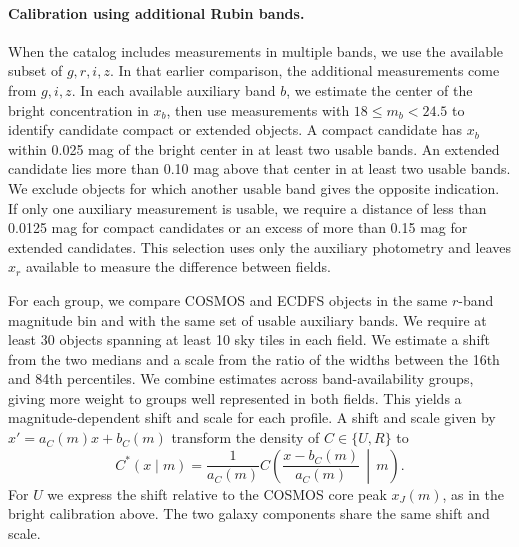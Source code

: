 \paragraph{Calibration using additional Rubin bands.}
When the catalog includes measurements in multiple bands, we use the
available subset of \(g,r,i,z\). In that earlier comparison, the additional measurements come from
\(g,i,z\). In each available auxiliary band \(b\), we estimate the
center of the bright concentration in \(x_b\), then use measurements
with \(18\leq m_b<24.5\) to identify candidate compact or extended
objects. A compact candidate has \(x_b\) within 0.025 mag of the
bright center in at least two usable bands. An extended candidate
lies more than 0.10 mag above that center in at least two usable bands.
We exclude objects for which another usable band gives the opposite
indication. If only one auxiliary measurement is usable, we require
a distance of less than 0.0125 mag for compact candidates or an excess
of more than 0.15 mag for extended candidates. This selection uses only
the auxiliary photometry and leaves \(x_r\) available to measure the
difference between fields.

For each group, we compare COSMOS and ECDFS objects in the same
\(r\)-band magnitude bin and with the same set of usable auxiliary
bands. We require at least 30 objects spanning at least 10 sky tiles
in each field. We estimate a shift from the two medians and a scale
from the ratio of the widths between the 16th and 84th percentiles.
We combine estimates across band-availability groups, giving more
weight to groups well represented in both fields. This yields a
magnitude-dependent shift and scale for each profile. A shift and
scale given by \(x'=a_C(m)x+b_C(m)\) transform the density of
\(C\in\{U,R\}\) to
\[
  C^*(x\mid m)=\frac{1}{a_C(m)}
   C\!\left(\frac{x-b_C(m)}{a_C(m)}\,\middle|\,m\right).
\]
For \(U\) we express the shift relative to the COSMOS core peak \(x_J(m)\),
as in the bright calibration above. The two galaxy components share
the same shift and scale.

